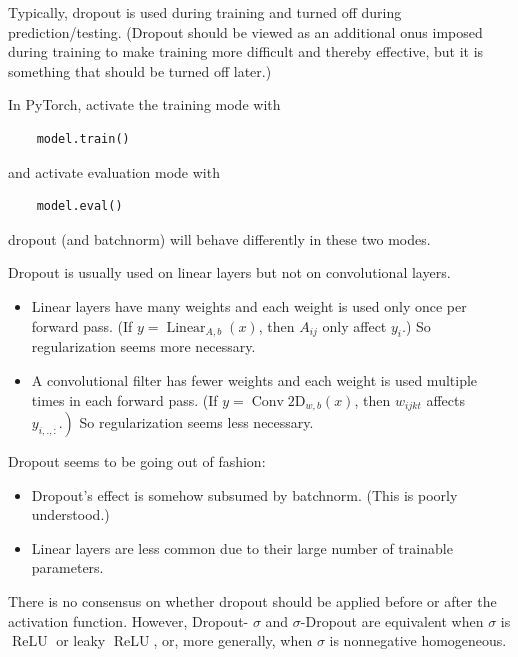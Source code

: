 \begin{concept}
    Typically, dropout is used during training and turned off during prediction/testing.
    (Dropout should be viewed as an additional onus imposed during training to make training more difficult and thereby effective, but it is something that should be turned off later.)

    In PyTorch, activate the training mode with

    \begin{verbatim}
    model.train()
    \end{verbatim}

    and activate evaluation mode with

    \begin{verbatim}
    model.eval()
    \end{verbatim}

    dropout (and batchnorm) will behave differently in these two modes.
\end{concept}

\begin{concept}
    Dropout is usually used on linear layers but not on convolutional layers.

    \begin{itemize}
        \item Linear layers have many weights and each weight is used only once per forward pass. (If $y=\operatorname{Linear}_{A, b}(x)$, then $A_{i j}$ only affect $y_{i}$.) So regularization seems more necessary.
        \item A convolutional filter has fewer weights and each weight is used multiple times in each forward pass. (If $y=\operatorname{Conv} 2 \mathrm{D}_{w, b}(x)$, then $w_{i j k t}$ affects $\left.y_{i, .,:}.\right)$ So regularization seems less necessary.
    \end{itemize}

    Dropout seems to be going out of fashion:

    \begin{itemize}
        \item Dropout's effect is somehow subsumed by batchnorm. (This is poorly understood.)
        \item Linear layers are less common due to their large number of trainable parameters.
    \end{itemize}

    There is no consensus on whether dropout should be applied before or after the activation function. However, Dropout- $\sigma$ and $\sigma$-Dropout are equivalent when $\sigma$ is $\operatorname{ReLU}$ or leaky $\operatorname{ReLU}$, or, more generally, when $\sigma$ is nonnegative homogeneous.
\end{concept}

